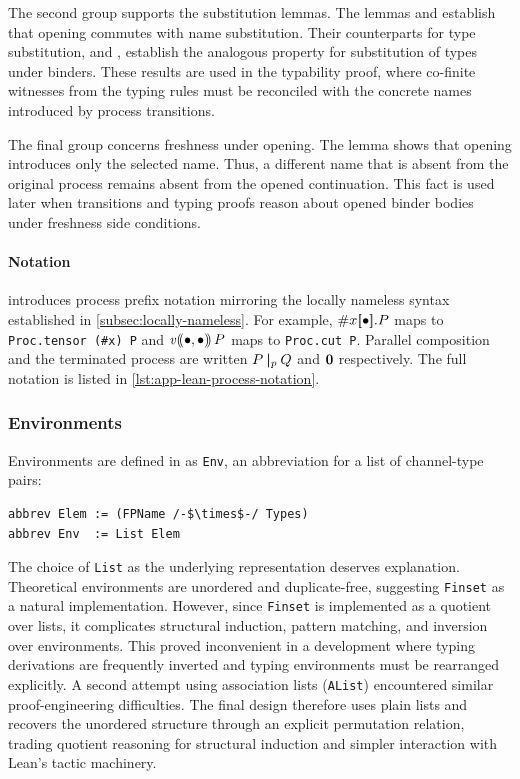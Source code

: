 The second group supports the substitution lemmas. The lemmas  and  establish that opening commutes with name substitution. Their counterparts for type substitution,  and , establish the analogous property for substitution of types under binders. These results are used in the typability proof, where co-finite witnesses from the typing rules must be reconciled with the concrete names introduced by process transitions.

The final group concerns freshness under opening. The lemma  shows that opening introduces only the selected name. Thus, a different name that is absent from the original process remains absent from the opened continuation. This fact is used later when transitions and typing proofs reason about opened binder bodies under freshness side conditions.

\paragraph{Notation}  introduces process prefix notation mirroring the locally nameless syntax established in \cref{subsec:locally-nameless}. For example, {$\#x\lbrack\mkern-4mu\lbrack\bullet\rbrack\mkern-4mu\rbrack.P$} maps to \texttt{Proc.tensor (\#x) P} and {$\mathit{v}\lparen\mkern-4mu\lparen\bullet,\bullet\rparen\mkern-4mu\rparen\, P$} maps to \texttt{Proc.cut P}. Parallel composition and the terminated process are written {$P \mathbin{\boldsymbol{|}}_p Q$} and {$\mathbf{0}$} respectively. The full notation is listed in \cref{lst:app-lean-process-notation}.

\subsubsection{Environments}\label{subsubsec:environments}
Environments are defined in  as 
\texttt{Env}, an abbreviation for a list of channel-type pairs:

\begin{lstlisting}[language=Lean4]
abbrev Elem := (FPName /-$\times$-/ Types)
abbrev Env  := List Elem
\end{lstlisting}

The choice of \texttt{List} as the underlying representation deserves explanation. Theoretical environments are unordered and duplicate-free, suggesting \texttt{Finset} as a natural implementation. However, since \texttt{Finset} is implemented as a quotient over lists, it complicates structural induction, pattern matching, and inversion over environments. This proved inconvenient in a development where typing derivations are frequently inverted and typing environments must be rearranged explicitly. A second attempt using association lists (\texttt{AList}) encountered similar proof-engineering difficulties. The final design therefore uses plain lists and recovers the unordered structure through an explicit permutation relation, trading quotient reasoning for structural induction and simpler interaction with Lean's tactic machinery.

